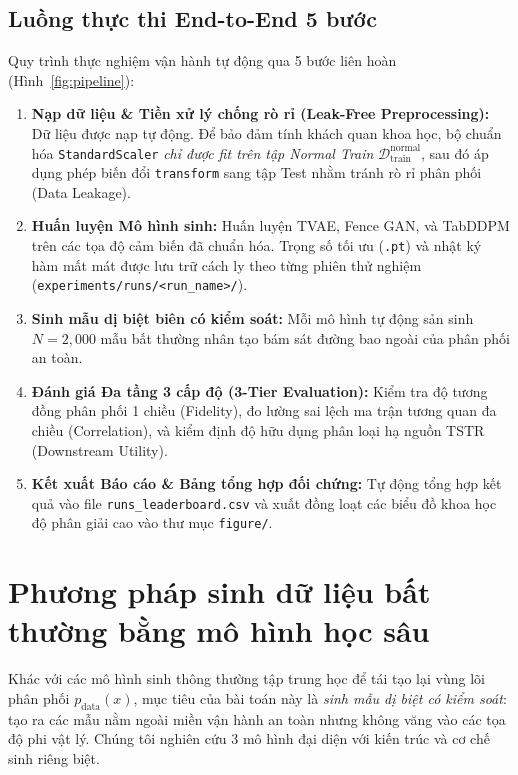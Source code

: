 \documentclass{article}
\begin{document}
\subsection{Luồng thực thi End-to-End 5 bước}
Quy trình thực nghiệm vận hành tự động qua 5 bước liên hoàn (Hình~\ref{fig:pipeline}):
\begin{enumerate}
    \item \textbf{Nạp dữ liệu \& Tiền xử lý chống rò rỉ (Leak-Free Preprocessing):} Dữ liệu được nạp tự động. Để bảo đảm tính khách quan khoa học, bộ chuẩn hóa \texttt{StandardScaler} \emph{chỉ được fit trên tập Normal Train} $\mathcal{D}_{\text{train}}^{\text{normal}}$, sau đó áp dụng phép biến đổi \texttt{transform} sang tập Test nhằm tránh rò rỉ phân phối (Data Leakage).
    \item \textbf{Huấn luyện Mô hình sinh:} Huấn luyện TVAE, Fence GAN, và TabDDPM trên các tọa độ cảm biến đã chuẩn hóa. Trọng số tối ưu (\texttt{.pt}) và nhật ký hàm mất mát được lưu trữ cách ly theo từng phiên thử nghiệm (\texttt{experiments/runs/<run\_name>/}).
    \item \textbf{Sinh mẫu dị biệt biên có kiểm soát:} Mỗi mô hình tự động sản sinh $N=2,000$ mẫu bất thường nhân tạo bám sát đường bao ngoài của phân phối an toàn.
    \item \textbf{Đánh giá Đa tầng 3 cấp độ (3-Tier Evaluation):} Kiểm tra độ tương đồng phân phối 1 chiều (Fidelity), đo lường sai lệch ma trận tương quan đa chiều (Correlation), và kiểm định độ hữu dụng phân loại hạ nguồn TSTR (Downstream Utility).
    \item \textbf{Kết xuất Báo cáo \& Bảng tổng hợp đối chứng:} Tự động tổng hợp kết quả vào file \texttt{runs\_leaderboard.csv} và xuất đồng loạt các biểu đồ khoa học độ phân giải cao vào thư mục \texttt{figure/}.
\end{enumerate}

\section{Phương pháp sinh dữ liệu bất thường bằng mô hình học sâu}
\label{sec:models}

Khác với các mô hình sinh thông thường tập trung học để tái tạo lại vùng lõi phân phối $p_{\text{data}}(x)$, mục tiêu của bài toán này là \emph{sinh mẫu dị biệt có kiểm soát}: tạo ra các mẫu nằm ngoài miền vận hành an toàn nhưng không văng vào các tọa độ phi vật lý. Chúng tôi nghiên cứu 3 mô hình đại diện với kiến trúc và cơ chế sinh riêng biệt.
\end{document}
